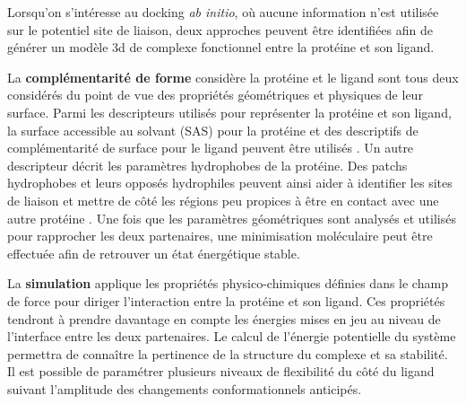 Lorsqu'on s'intéresse au docking \textit{ab initio}, où aucune information n'est utilisée sur le potentiel site de liaison, deux approches peuvent être identifiées afin de générer un modèle 3d de complexe fonctionnel entre la protéine et son ligand.

La \textbf{complémentarité de forme} considère la protéine et le ligand sont tous deux considérés du point de vue des propriétés géométriques et physiques de leur surface. Parmi les descripteurs utilisés pour représenter la protéine et son ligand, la surface accessible au solvant (SAS) pour la protéine et des descriptifs de complémentarité de surface pour le ligand peuvent être utilisés \cite{shoichet1992molecular}. Un autre descripteur décrit les paramètres hydrophobes de la protéine. Des patchs hydrophobes et leurs opposés hydrophiles peuvent ainsi aider à identifier les sites de liaison et mettre de côté les régions peu propices à être en contact avec une autre protéine \cite{jones1996principles}. Une fois que les paramètres géométriques sont analysés et utilisés pour rapprocher les deux partenaires, une minimisation moléculaire peut être effectuée afin de retrouver un état énergétique stable.

La \textbf{simulation} applique les propriétés physico-chimiques définies dans le champ de force pour diriger l'interaction entre la protéine et son ligand. Ces propriétés tendront à prendre davantage en compte les énergies mises en jeu au niveau de l'interface entre les deux partenaires. Le calcul de l'énergie potentielle du système permettra de connaître la pertinence de la structure du complexe et sa stabilité. Il est possible de paramétrer plusieurs niveaux de flexibilité du côté du ligand suivant l'amplitude des changements conformationnels anticipés.




